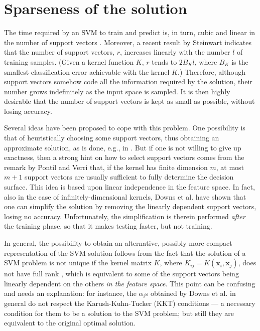 \documentclass[10pt,twocolumn,letterpaper]{article}
\def\xx{\mathbf{x}}
\begin{document}
\section{Sparseness of the solution}
\label{sec:spars}

The time required by an SVM to train and predict is, in turn, cubic
and linear in the number of support vectors
\cite{KeerthiCDC06}. Moreover, a recent result by Steinwart
\cite{Steinwart03} indicates that the number of support vectors, $r$,
increases linearly with the number $l$ of training samples. (Given a
kernel function $K$, $r$ tends to $2 B_K l$, where $B_K$ is the
smallest classification error achievable with the kernel $K$.)
Therefore, although support vectors somehow code all the information
required by the solution, their number grows indefinitely as the input
space is sampled. It is then highly desirable that the number of
support vectors is kept as small as possible, without losing accuracy.

Several ideas have been proposed to cope with this problem. One
possibility is that of heuristically choosing some support vectors,
thus obtaining an approximate solution, as is done, e.g., in
\cite{KeerthiCDC06,LeeM01,schoel06}. But if one is not willing to give
up exactness, then a strong hint on how to select support vectors
comes from the remark by Pontil and Verri \cite{PontilV98} that, if
the kernel has finite dimension $m$, at most $m + 1$ support vectors
are usually sufficient to fully determine the decision surface. This
idea is based upon linear independence in the feature space. In fact,
also in the case of infinitely-dimensional kernels, Downs et
al. \cite{DownsGM01} have shown that one can simplify the solution by
removing the linearly dependent support vectors, losing no
accuracy. Unfortunately, the simplification is therein performed
\emph{after} the training phase, so that it makes testing faster, but
not training.

In general, the possibility to obtain an alternative, possibly more
compact representation of the SVM solution follows from the fact that
the solution of a SVM problem is not unique if the
kernel matrix $K$, where $K_{ij} = K(\xx_i,\xx_j)$, does not have full
rank \cite{Burges98}, which is equivalent to some of the support vectors being
linearly dependent on the others \emph{in the feature space}. This
point can be confusing and needs an explanation: for instance, the
$\alpha_i$s obtained by Downs et al. in general do not respect the
Karush-Kuhn-Tucker (KKT) conditions --- a necessary condition for them
to be a solution to the SVM problem; but still they are equivalent to
the original optimal solution.
\end{document}
